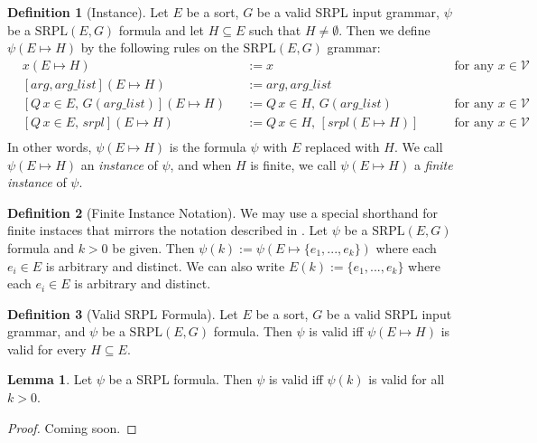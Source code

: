 \documentclass[12pt]{article}
\theoremstyle{definition}
\newtheorem{lemma}{Lemma}
\newtheorem{definition}{Definition}
\theoremstyle{remark}
\newcommand{\SRPL}{\text{SRPL}}
\begin{document}
\begin{definition}[Instance]
  Let $E$ be a sort, $G$ be a valid SRPL input grammar, $\psi$ be a $\SRPL(E,G)$ formula and let $H \subseteq E$ such that $H \neq \emptyset$.  Then we define $\psi(E \mapsto H)$ by the following rules on the $\SRPL(E,G)$ grammar:
  \begin{align*}
    &x(E \mapsto H)& &:= x \qquad &\text{for any } x \in \mathcal{V}\\
    &[arg,arg\_list](E \mapsto H)& &:= arg,arg\_list\\
    &[Q \, x \in E, \, G(arg\_list)](E \mapsto H)& &:= Q \, x \in H, \, G(arg\_list) \qquad &\text{for any } x \in \mathcal{V}\\
    &[Q \, x \in E, \, srpl](E \mapsto H)& &:=Q \, x \in H, \, [srpl(E \mapsto H)]  \qquad &\text{for any } x \in \mathcal{V}\\
  \end{align*}
  In other words, $\psi(E \mapsto H)$ is the formula $\psi$ with $E$ replaced with $H$.  We call $\psi(E \mapsto H)$ an \textit{instance} of $\psi$, and when $H$ is finite, we call $\psi(E \mapsto H)$ a \textit{finite instance} of $\psi$.
\end{definition}

\begin{definition}[Finite Instance Notation]
  We may use a special shorthand for finite instaces that mirrors the notation described in \cite{goel2021symmetry}.  Let $\psi$ be a $\SRPL(E,G)$ formula and $k>0$ be given.  Then $\psi(k) := \psi(E \mapsto \{e_1,...,e_k\})$ where each $e_i \in E$ is arbitrary and distinct.  We can also write $E(k) := \{e_1,...,e_k\}$ where each $e_i \in E$ is arbitrary and distinct.
\end{definition}

\begin{definition}[Valid SRPL Formula]
  Let $E$ be a sort, $G$ be a valid SRPL input grammar, and $\psi$ be a $\SRPL(E,G)$ formula.  Then $\psi$ is valid iff $\psi(E \mapsto H)$ is valid for every $H \subseteq E$.
\end{definition}

\begin{lemma}
  \label{lem:valid-all-k}
  Let $\psi$ be a SRPL formula.  Then $\psi$ is valid iff $\psi(k)$ is valid for all $k>0$.
\end{lemma}
\begin{proof}
  Coming soon.
\end{proof}
\end{document}
